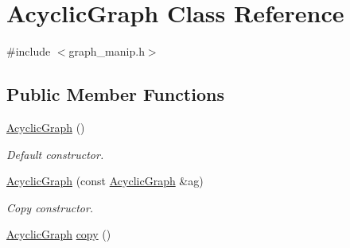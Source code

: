 \hypertarget{classAcyclicGraph}{}\section{Acyclic\+Graph Class Reference}
\label{classAcyclicGraph}


{\ttfamily \#include $<$graph\+\_\+manip.\+h$>$}

\subsection*{Public Member Functions}
\begin{DoxyCompactItemize}
\item 
\hyperlink{classAcyclicGraph_a939b4fffe09d7157d334509bdf8ce2be}{Acyclic\+Graph} ()\hypertarget{classAcyclicGraph_a939b4fffe09d7157d334509bdf8ce2be}{}\label{classAcyclicGraph_a939b4fffe09d7157d334509bdf8ce2be}

\begin{DoxyCompactList}\small\item\em Default constructor. \end{DoxyCompactList}\item 
\hyperlink{classAcyclicGraph_ab76060134cbc2754f3200f57da385ad2}{Acyclic\+Graph} (const \hyperlink{classAcyclicGraph}{Acyclic\+Graph} \&ag)\hypertarget{classAcyclicGraph_ab76060134cbc2754f3200f57da385ad2}{}\label{classAcyclicGraph_ab76060134cbc2754f3200f57da385ad2}

\begin{DoxyCompactList}\small\item\em Copy constructor. \end{DoxyCompactList}\item 
\hyperlink{classAcyclicGraph}{Acyclic\+Graph} \hyperlink{classAcyclicGraph_a0e3956f4b7ea48b386e32032ac139e04}{copy} ()\hypertarget{classAcyclicGraph_a0e3956f4b7ea48b386e32032ac139e04}{}\label{classAcyclicGraph_a0e3956f4b7ea48b386e32032ac139e04}


\end{DoxyCompactItemize}
